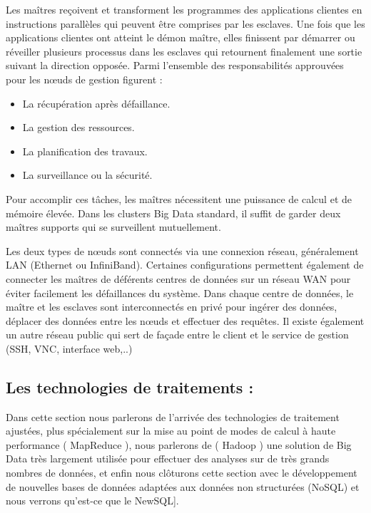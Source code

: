 Les maîtres reçoivent et transforment les programmes des applications clientes en instructions parallèles qui peuvent être comprises par les esclaves. Une fois que les applications clientes ont atteint le démon maître, elles finissent par démarrer ou réveiller plusieurs processus dans les esclaves qui retournent finalement une sortie suivant la direction opposée. Parmi l'ensemble des responsabilités approuvées pour les nœuds de gestion figurent :

\begin{itemize}\renewcommand{\labelitemi}{$\bullet$}
	\item La récupération après défaillance.
	\item La gestion des ressources.
	\item La planification des travaux.
	\item La surveillance ou la sécurité.
\end{itemize}

Pour accomplir ces tâches, les maîtres nécessitent une puissance de calcul et de mémoire élevée. Dans les clusters Big Data standard, il suffit de garder deux maîtres supports qui se surveillent mutuellement.

Les deux types de nœuds sont connectés via une connexion réseau, généralement LAN (Ethernet ou InfiniBand). Certaines configurations permettent également de connecter les maîtres de déférents centres de données sur un réseau WAN pour éviter facilement les défaillances du système. Dans chaque centre de données, le maître et les esclaves sont interconnectés en privé pour ingérer des données, déplacer des données entre les nœuds et effectuer des requêtes. Il existe également un autre réseau public qui sert de façade entre le client et le service de gestion (SSH, VNC, interface web,..)

\subsection{Les technologies de traitements :}
Dans cette section nous parlerons de l'arrivée des technologies de traitement ajustées, plus spécialement sur la mise au point de modes de calcul à haute performance ( MapReduce ), nous parlerons de ( Hadoop ) une solution de Big Data très largement utilisée pour effectuer des analyses sur de très grands nombres de données, et enfin nous clôturons cette section avec le développement de nouvelles bases de données adaptées aux données non structurées (NoSQL) et nous verrons qu'est-ce que le NewSQL].

